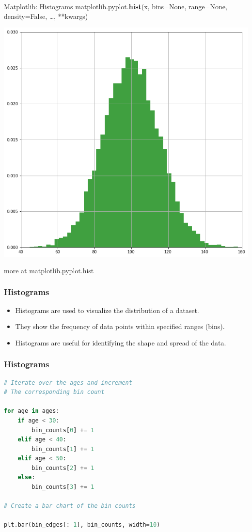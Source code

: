 \documentclass{beamer}
\begin{document}
    \begin{frame}[fragile]{Matplotlib: Histograms}
        matplotlib.pyplot.\textbf{hist}(x, bins=None, range=None, density=False, \dots, **kwargs)\\
        \begin{center}
            \includegraphics[width=\textwidth,height=0.6\textheight,keepaspectratio]{figures/Hist.png}\\
        \end{center}
        more at \href{https://matplotlib.org/stable/api/_as_gen/matplotlib.pyplot.hist.html}{matplotlib.pyplot.hist}
    \end{frame}
    \begin{frame}
        \frametitle{Histograms}
        \begin{itemize}
            \item Histograms are used to visualize the distribution of a dataset.
            \item They show the frequency of data points within specified ranges (bins).
            \item Histograms are useful for identifying the shape and spread of the data.
        \end{itemize}
    \end{frame}

    \begin{frame}[fragile]
        \frametitle{Histograms}
        \begin{lstlisting}[language=Python]
# Iterate over the ages and increment
# The corresponding bin count

for age in ages:
    if age < 30:
        bin_counts[0] += 1
    elif age < 40:
        bin_counts[1] += 1
    elif age < 50:
        bin_counts[2] += 1
    else:
        bin_counts[3] += 1

# Create a bar chart of the bin counts

plt.bar(bin_edges[:-1], bin_counts, width=10)
        \end{lstlisting}
    \end{frame}
\end{document}
